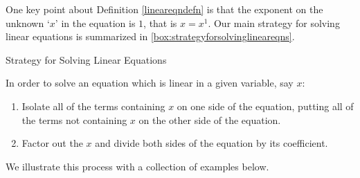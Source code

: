 One key point about Definition \ref{lineareqndefn} is that the exponent on the unknown `$x$' in the equation is $1$, that is $x = x^1$. Our main strategy for solving linear equations is summarized in \autoref{box:strategyforsolvinglineareqns}.

\begin{floatbox}{Strategy for Solving Linear Equations}
\label{box:strategyforsolvinglineareqns}

In order to solve an equation which is linear in a given variable, say $x$:

\begin{enumerate}

\item  Isolate all of the terms containing $x$ on one side of the equation, putting all of the terms not containing $x$ on the other side of the equation.

\item  Factor out the $x$ and divide both sides of the equation by its coefficient.

\end{enumerate}

\end{floatbox}

We illustrate this process with a collection of examples below.

